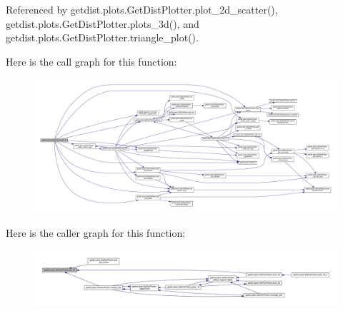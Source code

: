 Referenced by getdist.\+plots.\+Get\+Dist\+Plotter.\+plot\+\_\+2d\+\_\+scatter(), getdist.\+plots.\+Get\+Dist\+Plotter.\+plots\+\_\+3d(), and getdist.\+plots.\+Get\+Dist\+Plotter.\+triangle\+\_\+plot().

Here is the call graph for this function\+:
\nopagebreak
\begin{figure}[H]
\begin{center}
\leavevmode
\includegraphics[width=350pt]{classgetdist_1_1plots_1_1GetDistPlotter_a47d2f31e3d3cb751152be571a867a503_cgraph}
\end{center}
\end{figure}
Here is the caller graph for this function\+:
\nopagebreak
\begin{figure}[H]
\begin{center}
\leavevmode
\includegraphics[width=350pt]{classgetdist_1_1plots_1_1GetDistPlotter_a47d2f31e3d3cb751152be571a867a503_icgraph}
\end{center}
\end{figure}
\mbox{\label{classgetdist_1_1plots_1_1GetDistPlotter_a7cd2a179b15d78d19f07760d0ba698a1}} 
